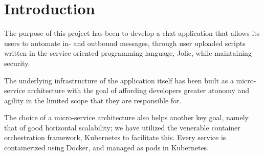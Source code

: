 
\section{Introduction}\label{sec:introduction}
The purpose of this project has been to develop a chat application that allows its users to automate in- and outbound messages,  through user uploaded scripts written in the service oriented programming language, Jolie, while maintaining security.

The underlying infrastructure of the application itself has been built as a micro-service architecture with the goal of affording developers greater atonomy and agility in the limited scope that they are responsible for.

The choice of a micro-service architecture also helps another key goal, namely that of good horizontal scalability; we have utilized the venerable container orchestration framework, Kubernetes to facilitate this. Every service is containerized using Docker, and managed as pods in Kubernetes.